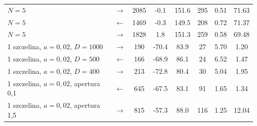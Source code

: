 \documentclass[12pt, a4paper]{article}
\begin{document}
\begin{table}[H]
\begin{tabular}{l c S[table-format=4.0] S[table-format=-3.1] S[table-format=-3.1]
                    S[table-format=3.0] S[table-format=1.2] S[table-format=2.2]}
        $N = 5$ & $\rightarrow$ & 2085 & -0.1 & 151.6 & 295 & 0.51 & 71.63 \\
        $N = 5$ & $\leftarrow$ & 1469 & -0.3 & 149.5 & 208 & 0.72 & 71.37 \\
        $N = 5$ & $\rightarrow$ & 1828 & 1.8 & 151.3 & 259 & 0.58 & 69.48 \\
        1 szczelina, $a = 0{,}02$, $D = 1000$ & $\rightarrow$ & 190 & -70.4 & 83.9 & 27 & 5.70 & 1.20 \\
        1 szczelina, $a = 0{,}02$, $D = 500$ & $\leftarrow$ & 166 & -68.9 & 86.1 & 24 & 6.52 & 1.47 \\
        1 szczelina, $a = 0{,}02$, $D = 400$ & $\rightarrow$ & 213 & -72.8 & 80.4 & 30 & 5.04 & 1.95 \\
        1 szczelina, $a = 0{,}02$, apertura 0,1 & $\leftarrow$ & 645 & -67.5 & 83.1 & 91 & 1.65 & 1.34 \\
        1 szczelina, $a = 0{,}02$, apertura 1,5 & $\rightarrow$ & 815 & -57.3 & 88.0 & 116 & 1.25 & 12.04 \\
        \bottomrule
    \end{tabular}
\end{table}
\end{document}

